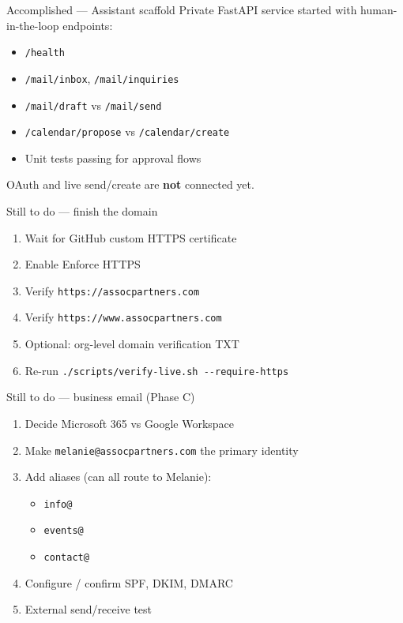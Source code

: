 \documentclass[aspectratio=169,11pt]{beamer}
\begin{document}
\begin{frame}{Accomplished --- Assistant scaffold}
  Private FastAPI service started with human-in-the-loop endpoints:

  \begin{itemize}
    \item \texttt{/health}
    \item \texttt{/mail/inbox}, \texttt{/mail/inquiries}
    \item \texttt{/mail/draft} vs \texttt{/mail/send}
    \item \texttt{/calendar/propose} vs \texttt{/calendar/create}
    \item Unit tests passing for approval flows
  \end{itemize}

  \vspace{0.5em}
  OAuth and live send/create are \textbf{not} connected yet.
\end{frame}

\begin{frame}{Still to do --- finish the domain}
  \begin{enumerate}
    \item Wait for GitHub custom HTTPS certificate
    \item Enable Enforce HTTPS
    \item Verify \texttt{https://assocpartners.com}
    \item Verify \texttt{https://www.assocpartners.com}
    \item Optional: org-level domain verification TXT
    \item Re-run \texttt{./scripts/verify-live.sh -{}-require-https}
  \end{enumerate}
\end{frame}

\begin{frame}{Still to do --- business email (Phase C)}
  \begin{enumerate}
    \item Decide Microsoft 365 vs Google Workspace
    \item Make \texttt{melanie@assocpartners.com} the primary identity
    \item Add aliases (can all route to Melanie):
      \begin{itemize}
        \item \texttt{info@}
        \item \texttt{events@}
        \item \texttt{contact@}
      \end{itemize}
    \item Configure / confirm SPF, DKIM, DMARC
    \item External send/receive test
  \end{enumerate}
\end{frame}
\end{document}
